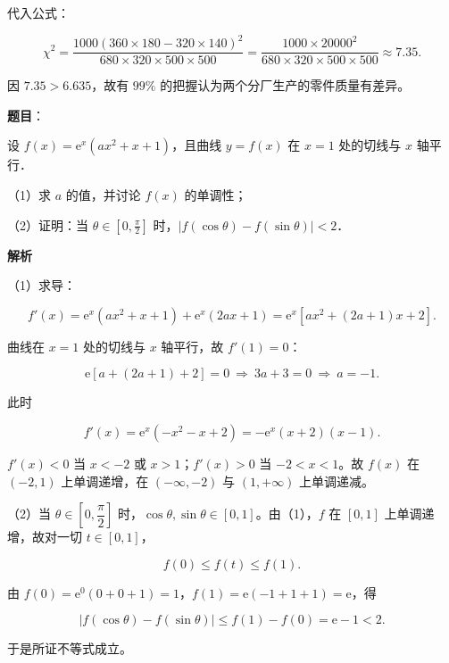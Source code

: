 \begin{answer}
代入公式：

\nopagebreak[4]
\[\chi^2=\frac{1000(360\times180-320\times140)^2}{680\times320\times500\times500}
=\frac{1000\times20000^2}{680\times320\times500\times500}\approx7.35 .\]

因 $7.35>6.635$，故有 $99\%$ 的把握认为两个分厂生产的零件质量有差异。


\end{answer}
\begin{answer}

\textbf{题目}：

设 $f(x)=\mathrm e^x(ax^2+x+1)$，且曲线 $y=f(x)$ 在 $x=1$ 处的切线与 $x$ 轴平行．

（1）求 $a$ 的值，并讨论 $f(x)$ 的单调性；

（2）证明：当 $\theta\in\left[0,\frac\pi2\right]$ 时，$|f(\cos\theta)-f(\sin\theta)|<2$．

\textbf{解析}

（1）求导：

\nopagebreak[4]
\[f'(x)=\mathrm e^x(ax^2+x+1)+\mathrm e^x(2ax+1)
=\mathrm e^x\left[ax^2+(2a+1)x+2\right].\]

曲线在 $x=1$ 处的切线与 $x$ 轴平行，故 $f'(1)=0$：

\nopagebreak[4]
\[\mathrm e\left[a+(2a+1)+2\right]=0\ \Longrightarrow\ 3a+3=0\ \Longrightarrow\ a=-1 .\]

此时

\nopagebreak[4]
\[f'(x)=\mathrm e^x(-x^2-x+2)=-\mathrm e^x(x+2)(x-1).\]

$f'(x)<0$ 当 $x<-2$ 或 $x>1$；$f'(x)>0$ 当 $-2<x<1$。故 $f(x)$ 在 $(-2,1)$ 上单调递增，在 $(-\infty,-2)$ 与 $(1,+\infty)$ 上单调递减。

（2）当 $\theta\in\left[0,\dfrac\pi2\right]$ 时，$\cos\theta,\sin\theta\in[0,1]$。由（1），$f$ 在 $[0,1]$ 上单调递增，故对一切 $t\in[0,1]$，

\nopagebreak[4]
\[f(0)\leqslant f(t)\leqslant f(1).\]

由 $f(0)=\mathrm e^0(0+0+1)=1$，$f(1)=\mathrm e(-1+1+1)=\mathrm e$，得

\nopagebreak[4]
\[|f(\cos\theta)-f(\sin\theta)|\leqslant f(1)-f(0)=\mathrm e-1<2 .\]

于是所证不等式成立。


\end{answer}
